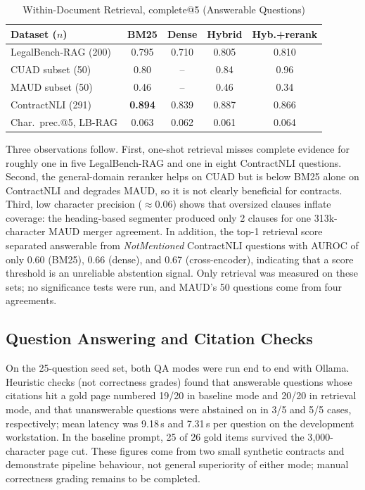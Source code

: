 \documentclass[conference]{IEEEtran}
\begin{document}
\begin{table}[t]
\caption{Within-Document Retrieval, complete@5 (Answerable Questions)}
\label{tab:ret}
\centering
\footnotesize
\setlength{\tabcolsep}{4pt}
\begin{tabular}{@{}lcccc@{}}
\toprule
\textbf{Dataset ($n$)} & \textbf{BM25} & \textbf{Dense} & \textbf{Hybrid} & \textbf{Hyb.+rerank} \\
\midrule
LegalBench-RAG (200) & 0.795 & 0.710 & 0.805 & 0.810 \\
\quad CUAD subset (50) & 0.80 & -- & 0.84 & 0.96 \\
\quad MAUD subset (50) & 0.46 & -- & 0.46 & 0.34 \\
ContractNLI (291) & \textbf{0.894} & 0.839 & 0.887 & 0.866 \\
\midrule
Char.\ prec.@5, LB-RAG & 0.063 & 0.062 & 0.061 & 0.064 \\
\bottomrule
\end{tabular}
\end{table}

Three observations follow. First, one-shot retrieval misses complete evidence for roughly one in five LegalBench-RAG and one in eight ContractNLI questions. Second, the general-domain reranker helps on CUAD but is below BM25 alone on ContractNLI and degrades MAUD, so it is not clearly beneficial for contracts. Third, low character precision ($\approx$0.06) shows that oversized clauses inflate coverage: the heading-based segmenter produced only 2 clauses for one 313k-character MAUD merger agreement. In addition, the top-1 retrieval score separated answerable from \emph{NotMentioned} ContractNLI questions with AUROC of only 0.60 (BM25), 0.66 (dense), and 0.67 (cross-encoder), indicating that a score threshold is an unreliable abstention signal. Only retrieval was measured on these sets; no significance tests were run, and MAUD's 50 questions come from four agreements.

\subsection{Question Answering and Citation Checks}
On the 25-question seed set, both QA modes were run end to end with Ollama. Heuristic checks (not correctness grades) found that answerable questions whose citations hit a gold page numbered 19/20 in baseline mode and 20/20 in retrieval mode, and that unanswerable questions were abstained on in 3/5 and 5/5 cases, respectively; mean latency was 9.18\,s and 7.31\,s per question on the development workstation. In the baseline prompt, 25 of 26 gold items survived the 3{,}000-character page cut. These figures come from two small synthetic contracts and demonstrate pipeline behaviour, not general superiority of either mode; manual correctness grading remains to be completed.
\end{document}
